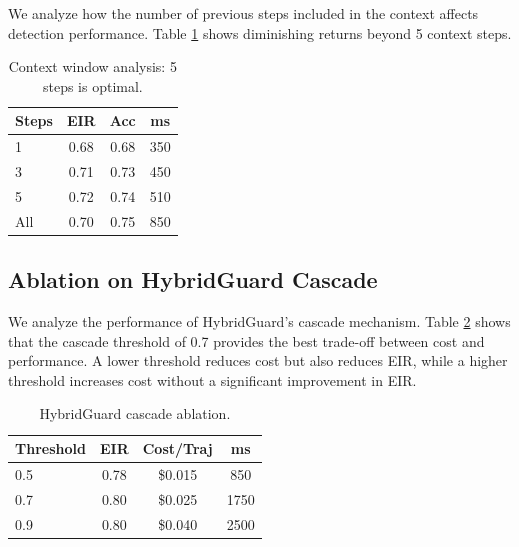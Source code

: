 \documentclass{article}
\begin{document}
We analyze how the number of previous steps included in the context affects detection performance. Table \ref{tab:context_window} shows diminishing returns beyond 5 context steps.

\begin{table}[h]
\caption{Context window analysis: 5 steps is optimal.}
\label{tab:context_window}
\vskip 0.15in
\begin{center}
\begin{small}
\begin{sc}
\begin{tabular}{lccc}
\toprule
Steps & EIR & Acc & ms \\
\midrule
1 & 0.68 & 0.68 & 350 \\
3 & 0.71 & 0.73 & 450 \\
5 & 0.72 & 0.74 & 510 \\
All & 0.70 & 0.75 & 850 \\
\bottomrule
\end{tabular}
\end{sc}
\end{small}
\end{center}
\vskip -0.1in
\end{table}

\subsection{Ablation on HybridGuard Cascade}

We analyze the performance of HybridGuard's cascade mechanism. Table \ref{tab:cascade_ablation} shows that the cascade threshold of 0.7 provides the best trade-off between cost and performance. A lower threshold reduces cost but also reduces EIR, while a higher threshold increases cost without a significant improvement in EIR.

\begin{table}[h]
\caption{HybridGuard cascade ablation.}
\label{tab:cascade_ablation}
\vskip 0.15in
\begin{center}
\begin{small}
\begin{sc}
\begin{tabular}{lccc}
\toprule
Threshold & EIR & Cost/Traj & ms \\
\midrule
0.5 & 0.78 & \$0.015 & 850 \\
0.7 & 0.80 & \$0.025 & 1750 \\
0.9 & 0.80 & \$0.040 & 2500 \\
\bottomrule
\end{tabular}
\end{sc}
\end{small}
\end{center}
\vskip -0.1in
\end{table}
\end{document}

